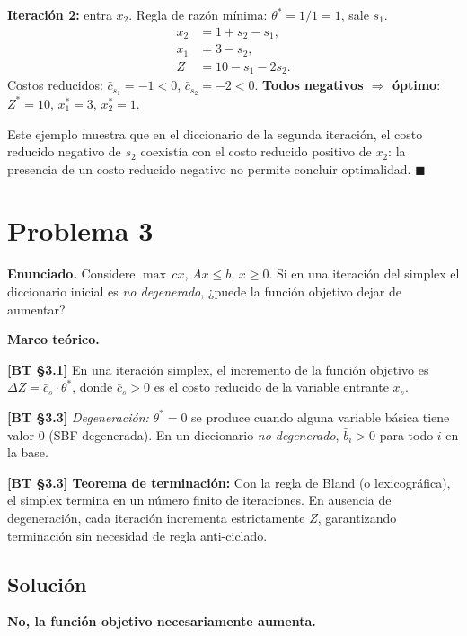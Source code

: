 \documentclass{article}
\newenvironment{marco}{\begin{mdframed}[linecolor=black!40,backgroundcolor=gray!5]\small\textbf{Marco teórico.}\par\smallskip}{\end{mdframed}\medskip}
\begin{document}
\textbf{Iteración 2:} entra $x_2$. Regla de razón mínima: $\theta^* = 1/1 = 1$, sale $s_1$.
\begin{align*}
  x_2 &= 1 + s_2 - s_1, \\
  x_1 &= 3 - s_2, \\
  Z &= 10 - s_1 - 2s_2.
\end{align*}
Costos reducidos: $\bar{c}_{s_1} = -1 < 0$, $\bar{c}_{s_2} = -2 < 0$. \textbf{Todos negativos $\Rightarrow$ óptimo}: $Z^* = 10$, $x_1^* = 3$, $x_2^* = 1$.

Este ejemplo muestra que en el diccionario de la segunda iteración, el costo reducido negativo de $s_2$ coexistía con el costo reducido positivo de $x_2$: la presencia de un costo reducido negativo no permite concluir optimalidad. $\blacksquare$

\section*{Problema 3}

\textbf{Enunciado.} Considere $\max\, cx$, $Ax \leq b$, $x \geq 0$. Si en una iteración del simplex el diccionario inicial es \emph{no degenerado}, ¿puede la función objetivo dejar de aumentar?

\begin{marco}
\textbf{[BT §3.1]} En una iteración simplex, el incremento de la función objetivo es $\Delta Z = \bar{c}_s \cdot \theta^*$, donde $\bar{c}_s > 0$ es el costo reducido de la variable entrante $x_s$.

\textbf{[BT §3.3]} \emph{Degeneración:} $\theta^* = 0$ se produce cuando alguna variable básica tiene valor $0$ (SBF degenerada). En un diccionario \emph{no degenerado}, $\bar{b}_i > 0$ para todo $i$ en la base.

\textbf{[BT §3.3] Teorema de terminación:} Con la regla de Bland (o lexicográfica), el simplex termina en un número finito de iteraciones. En ausencia de degeneración, cada iteración incrementa estrictamente $Z$, garantizando terminación sin necesidad de regla anti-ciclado.
\end{marco}

\subsection*{Solución}

\textbf{No, la función objetivo necesariamente aumenta.}
\end{document}
